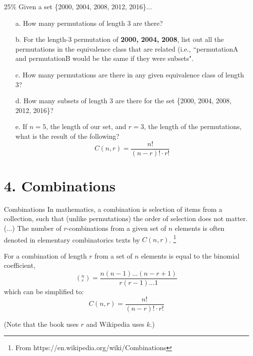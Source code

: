 \documentclass[a4paper,12pt]{book}
\begin{document}
        \begin{question}{5}{25\%}
            Given a set \{2000, 2004, 2008, 2012, 2016\}...

            \begin{enumerate}
                \item[a.] How many permutations of length 3 are there?

                \item[b.] For the length-3 permutation of \textbf{2000, 2004, 2008},
                    list out all the permutations in the equivalence class
                    that are related (i.e., ``permutationA and permutationB would
                    be the same if they were subsets".
                
                \item[c.] How many permutations are there in any given
                    equivalence class of length 3?

                \item[d.] How many subsets of length 3 are there for the set \{2000, 2004, 2008, 2012, 2016\}?

                \item[e.] If $n = 5$, the length of our set, and $r = 3$, the length of
                the permutations, what is the result of the following?
                $$C(n,r) = \frac{n!}{(n-r)! \cdot r!}$$
            \end{enumerate}
        \end{question}

    \section*{4. Combinations}

        \begin{intro}{Combinations}
            In mathematics, a combination is selection of items from a collection,
            such that (unlike permutations) the order of selection does not matter.
            (...) The number of $r$-combinations from a given set of $n$ elements
            is often denoted in elementary combinatorics texts by $C(n,r)$.
            \footnote{From https://en.wikipedia.org/wiki/Combinations}

            For a combination of length $r$ from a set of $n$ elements
            is equal to the binomial coefficient,
            $$(^{n}_{r}) = \frac{n(n-1) ... (n-r+1)}{r(r-1)...1}$$
            which can be simplified to:
            $$C(n,r) = \frac{n!}{(n-r)! \cdot r!}$$

            (Note that the book uses $r$ and Wikipedia uses $k$.)
        \end{intro}
\end{document}
